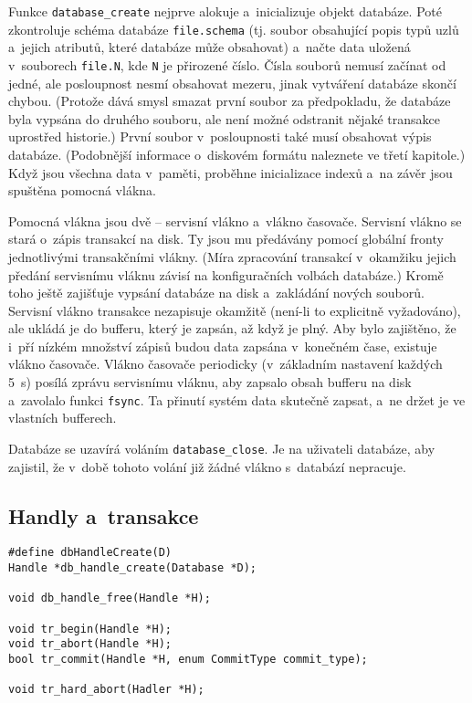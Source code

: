 Funkce \verb|database_create| nejprve alokuje a~inicializuje objekt databáze.
Poté zkontroluje schéma databáze \verb|file.schema| (tj. soubor obsahující popis typů
uzlů a~jejich atributů, které databáze může obsahovat) a~načte data uložená v~souborech
\verb|file.N|, kde \verb|N| je přirozené číslo. Čísla souborů nemusí začínat od
jedné, ale posloupnost nesmí obsahovat mezeru, jinak vytváření databáze skončí chybou.
(Protože dává smysl smazat první soubor za předpokladu, že databáze byla vypsána
do druhého souboru, ale není možné odstranit nějaké transakce uprostřed historie.)
První soubor v~posloupnosti také musí obsahovat výpis databáze.
(Podobnější informace o~diskovém formátu naleznete ve třetí kapitole.)
Když jsou všechna data v~paměti, proběhne inicializace indexů a~na závěr jsou spuštěna
pomocná vlákna.

Pomocná vlákna jsou dvě -- servisní vlákno a~vlákno časovače. Servisní vlákno se stará
o~zápis transakcí na disk. Ty jsou mu předávány pomocí globální fronty jednotlivými
transakčními vlákny. (Míra zpracování transakcí v~okamžiku jejich předání servisnímu
vláknu závisí na konfiguračních volbách databáze.) Kromě toho ještě zajišťuje
vypsání databáze na disk a~zakládání nových souborů. Servisní vlákno transakce
nezapisuje okamžitě (není-li to explicitně vyžadováno), ale ukládá je do bufferu,
který je zapsán, až když je plný. Aby bylo zajištěno, že i~pří nízkém množství zápisů
budou data zapsána v~konečném čase, existuje vlákno časovače. Vlákno časovače periodicky
(v~základním nastavení každých 5~s) posílá zprávu servisnímu vláknu, aby zapsalo obsah
bufferu na disk a~zavolalo funkci \verb|fsync|. Ta přinutí systém data skutečně
zapsat, a~ne držet je ve vlastních bufferech.

Databáze se uzavírá voláním \verb|database_close|. Je na
uživateli databáze, aby zajistil, že v~době tohoto volání již žádné vlákno s~databází
nepracuje.

\subsection{Handly a~transakce}
\begin{verbatim}
#define dbHandleCreate(D)
Handle *db_handle_create(Database *D);

void db_handle_free(Handle *H);

void tr_begin(Handle *H);
void tr_abort(Handle *H);
bool tr_commit(Handle *H, enum CommitType commit_type);

void tr_hard_abort(Hadler *H);
\end{verbatim}

